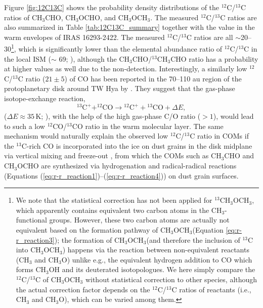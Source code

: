 \documentclass[twocolumn, twocolappendix, astrosymb, times]{aastex631}
\newcommand{\acetaldehyde}{CH$_3$CHO\xspace}
\newcommand{\methylformate}{CH$_3$OCHO\xspace}
\newcommand{\dimethylether}{CH$_3$OCH$_3$\xspace}
\begin{document}
Figure \ref{fig:12C13C} shows the probability density distributions of the $^{12}$C/$^{13}$C ratios of \acetaldehyde, \methylformate, and \dimethylether. The measured $^{12}$C/$^{13}$C ratios are also summarized in Table \ref{tab:12C13C_summary} together with the value in the warm envelopes of IRAS 16293-2422.  The measured $^{12}$C/$^{13}$C ratios are all $\sim$20--30\footnote{We note that the statistical correction has not been applied for $^{13}$\dimethylether, which apparently contains equivalent two carbon atoms in the CH$_3$- functional groups. However, these two carbon atoms are actually not equivalent based on the formation pathway of \dimethylether (Equation \ref{eq:r-r_reaction3}); the formation of \dimethylether (and therefore the inclusion of $^{13}$C into \dimethylether) happens via the reaction between non-equivalent reactants (CH$_3$ and CH$_3$O) unlike e.g., the equivalent hydrogen addition to CO which forms CH$_3$OH and its deuterated isotopologues. We here simply compare the $^{12}$C/$^{13}$C of \dimethylether without statistical correction to other species, although the actual correction factor depends on the $^{12}$C/$^{13}$C ratios of reactants (i.e., CH$_3$ and CH$_3$O), which can be varied among them.}, which is significantly lower than the elemental abundance ratio of $^{12}$C/$^{13}$C in the local ISM ($\sim$ 69; \citealt{Wilson1999}), although the \acetaldehyde/$^{13}$CH$_3$CHO ratio has a probability at higher values as well due to the non-detection. Interestingly, a similarly low $^{12}$C/$^{13}$C ratio ($21\pm5$) of CO has been reported in the 70--110 au region of the protoplanetary disk around TW Hya by \citet{Yoshida2022_12CO13CO} \citep[see also][]{Zhang2017}. They suggest that the gas-phase isotope-exchange reaction, 
\begin{equation}\label{eq:12C13C_reaction}
    ^{13}\mathrm{C}^+ + ^{12}\mathrm{CO} \to {}^{12}\mathrm{C}^+ + {}^{13}\mathrm{CO} + \Delta E,
\end{equation}
($\Delta E \approx 35$\,K; \citealt{Langer1984, Furuya2011}), with the help of the high gas-phase C/O ratio ($> 1$), would lead to such a low $^{12}$CO/$^{13}$CO ratio in the warm molecular layer. The same mechanism would naturally explain the observed low $^{12}$C/$^{13}$C ratio in COMs if the $^{13}$C-rich CO is incorporated into the ice on dust grains in the disk midplane via vertical mixing and freeze-out \citep{Furuya2022}, from which the COMs such as \acetaldehyde and \methylformate are synthesized via hydrogenation and radical-radical reactions (Equations (\ref{eq:r-r_reaction1})--(\ref{eq:r-r_reaction4})) on dust grain surfaces.
\end{document}
